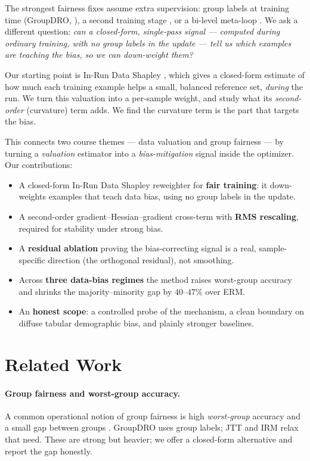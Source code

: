\documentclass[letterpaper]{article}
\begin{document}
The strongest fairness fixes assume extra supervision: group labels at training
time (GroupDRO, \citealp{sagawa2020groupdro}), a second training stage
\citep{liu2021jtt}, or a bi-level meta-loop \citep{ren2018reweight}. We ask a
different question: \emph{can a closed-form, single-pass signal --- computed during
ordinary training, with no group labels in the update --- tell us which examples
are teaching the bias, so we can down-weight them?}

Our starting point is In-Run Data Shapley \citep{wang2024inrun}, which gives a
closed-form estimate of how much each training example helps a small, balanced
reference set, \emph{during} the run. We turn this valuation into a per-sample
weight, and study what its \emph{second-order} (curvature) term adds. We find the
curvature term is the part that targets the bias.

This connects two course themes --- data valuation and group fairness --- by
turning a \emph{valuation} estimator into a \emph{bias-mitigation} signal inside
the optimizer. Our contributions:
\begin{itemize}\setlength{\itemsep}{1pt}
\item A closed-form In-Run Data Shapley reweighter for \textbf{fair training}: it
down-weights examples that teach data bias, using no group labels in the update.
\item A second-order gradient--Hessian--gradient cross-term with \textbf{RMS
rescaling}, required for stability under strong bias.
\item A \textbf{residual ablation} proving the bias-correcting signal is a real,
sample-specific direction (the orthogonal residual), not smoothing.
\item Across \textbf{three data-bias regimes} the method raises worst-group
accuracy and shrinks the majority--minority gap by $40$--$47\%$ over ERM.
\item An \textbf{honest scope}: a controlled probe of the mechanism, a clean
boundary on diffuse tabular demographic bias, and plainly stronger baselines.
\end{itemize}

\section{Related Work}

\paragraph{Group fairness and worst-group accuracy.}
A common operational notion of group fairness is high \emph{worst-group} accuracy
and a small gap between groups \citep{sagawa2020groupdro}. GroupDRO uses group
labels; JTT \citep{liu2021jtt} and IRM \citep{arjovsky2019irm} relax that need.
These are strong but heavier; we offer a closed-form alternative and report the
gap honestly.
\end{document}
